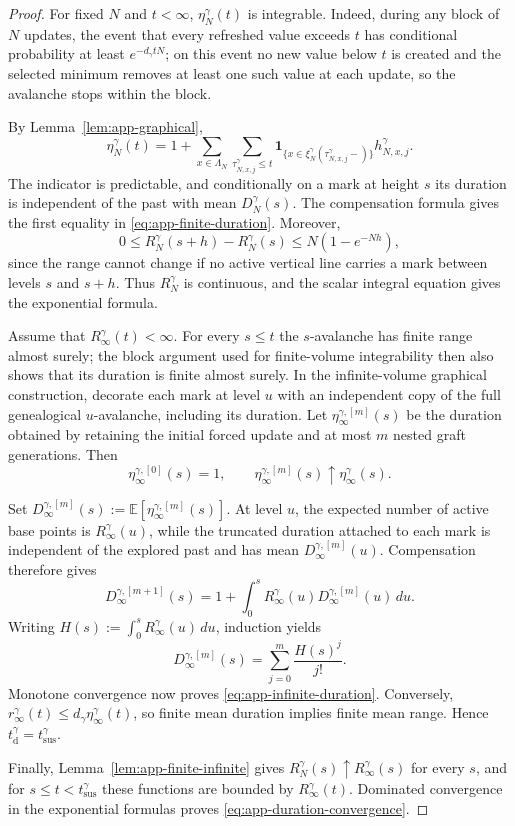 \documentclass[11pt,a4paper]{amsart}
\theoremstyle{remark}
\begin{document}
\begin{proof}
For fixed $N$ and $t<\infty$, $\eta_N^\gamma(t)$ is integrable. Indeed,
during any block of $N$ updates, the event that every refreshed value
exceeds $t$ has conditional probability at least $e^{-d_\gamma tN}$; on
this event no new value below $t$ is created and the selected minimum
removes at least one such value at each update, so the avalanche stops
within the block.

By Lemma~\ref{lem:app-graphical},
\[
        \eta_N^\gamma(t)
        =
        1+
        \sum_{x\in\Lambda_N}
        \sum_{\tau_{N,x,j}^\gamma\leq t}
        \mathbf 1_{\{x\in
        \xi_N^\gamma(\tau_{N,x,j}^\gamma-)\}}
        h_{N,x,j}^\gamma.
\]
The indicator is predictable, and conditionally on a mark at height $s$
its duration is independent of the past with mean $D_N^\gamma(s)$. The
compensation formula gives the first equality in
\eqref{eq:app-finite-duration}. Moreover,
\[
        0\leq
        R_N^\gamma(s+h)-R_N^\gamma(s)
        \leq N(1-e^{-Nh}),
\]
since the range cannot change if no active vertical line carries a mark
between levels $s$ and $s+h$. Thus $R_N^\gamma$ is continuous, and the
scalar integral equation gives the exponential formula.

Assume that $R_\infty^\gamma(t)<\infty$. For every $s\leq t$ the
$s$-avalanche has finite range almost surely; the block argument used
for finite-volume integrability then also shows that its duration is
finite almost surely. In the infinite-volume graphical construction,
decorate each mark at level $u$ with an independent copy of the full
genealogical $u$-avalanche, including its duration. Let
$\eta_\infty^{\gamma,[m]}(s)$ be the duration obtained by retaining the
initial forced update and at most $m$ nested graft generations. Then
\[
        \eta_\infty^{\gamma,[0]}(s)=1,
        \qquad
        \eta_\infty^{\gamma,[m]}(s)
        \uparrow\eta_\infty^\gamma(s).
\]

Set
$D_\infty^{\gamma,[m]}(s)
:=\mathbb{E}[\eta_\infty^{\gamma,[m]}(s)]$. At level $u$, the expected
number of active base points is $R_\infty^\gamma(u)$, while the
truncated duration attached to each mark is independent of the explored
past and has mean $D_\infty^{\gamma,[m]}(u)$. Compensation therefore
gives
\[
        D_\infty^{\gamma,[m+1]}(s)
        =
        1+\int_0^s
        R_\infty^\gamma(u)D_\infty^{\gamma,[m]}(u)\,du.
\]
Writing $H(s):=\int_0^sR_\infty^\gamma(u)\,du$, induction yields
\[
        D_\infty^{\gamma,[m]}(s)
        =
        \sum_{j=0}^m\frac{H(s)^j}{j!}.
\]
Monotone convergence now proves
\eqref{eq:app-infinite-duration}. Conversely,
$r_\infty^\gamma(t)\leq d_\gamma\eta_\infty^\gamma(t)$, so finite mean
duration implies finite mean range. Hence
$t_{\mathrm d}^\gamma=t_{\mathrm{sus}}^\gamma$.

Finally, Lemma~\ref{lem:app-finite-infinite} gives
$R_N^\gamma(s)\uparrow R_\infty^\gamma(s)$ for every $s$, and for
$s\leq t<t_{\mathrm{sus}}^\gamma$ these functions are bounded by
$R_\infty^\gamma(t)$. Dominated convergence in the exponential formulas
proves \eqref{eq:app-duration-convergence}.
\end{proof}
\end{document}
